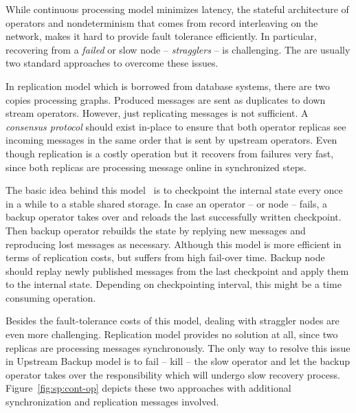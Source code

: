 While continuous processing model minimizes latency, the stateful architecture of operators and nondeterminism that comes from record interleaving on the network, makes it hard to provide fault tolerance efficiently. In particular, recovering from a \emph{failed} or slow node -- \emph{stragglers} -- is challenging. The are usually two standard approaches to overcome these issues.
\begin{description}[leftmargin=0pt]
    \item[Replication] In replication model which is borrowed from database systems, there are two copies processing graphs. Produced messages are sent as duplicates to down stream operators. However, just replicating messages is not sufficient. A \emph{consensus protocol} should exist in-place to ensure that both operator replicas see incoming messages in the same order that is sent by upstream operators. Even though replication is a costly operation but it recovers from failures very fast, since both replicas are processing message online in synchronized steps.
    \item[Upstream Backup] The basic idea behind this model~\cite{Hwang:2005} is to checkpoint the internal state every once in a while to a stable shared storage. In case an operator -- or node -- fails, a backup operator takes over and reloads the last successfully written checkpoint. Then backup operator rebuilds the state by replying new messages and reproducing lost messages as necessary. Although this model is more efficient in terms of replication costs, but suffers from high fail-over time. Backup node should replay newly published messages from the last checkpoint and apply them to the internal state. Depending on checkpointing interval, this might be a time consuming operation.
\end{description}
Besides the fault-tolerance costs of this model, dealing with straggler nodes are even more challenging. Replication model provides no solution at all, since two replicas are processing messages synchronously. The only way to resolve this issue in Upstream Backup model is to fail -- kill -- the slow operator and let the backup operator takes over the responsibility which will undergo slow recovery process. Figure~\ref{fig:sp:cont-op} depicts these two approaches with additional synchronization and replication messages involved.
